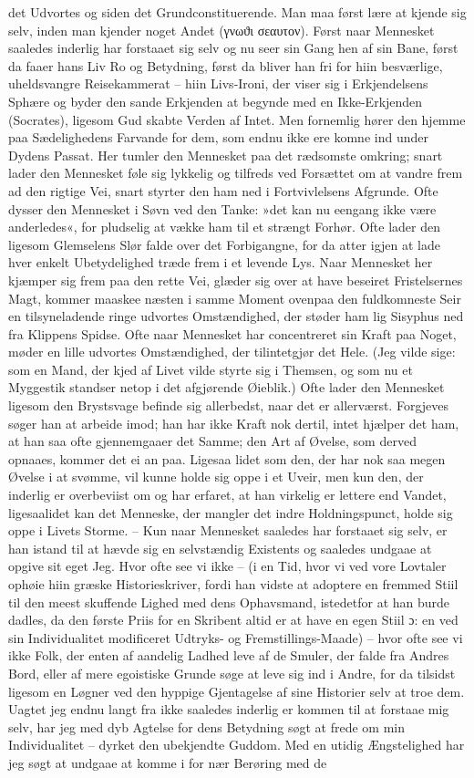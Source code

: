 \documentclass[12pt,a4paper]{article}
\begin{document}
det Udvortes og siden det Grundconstituerende. Man maa først lære at kjende sig selv, inden man kjender noget Andet (γνωϑι σεαυτον). Først naar Mennesket saaledes inderlig har forstaaet sig selv og nu seer sin Gang hen af sin Bane, først da faaer hans Liv Ro og Betydning, først da bliver han fri for hiin besværlige, uheldsvangre Reisekammerat – hiin Livs-Ironi, der viser sig i Erkjendelsens Sphære og byder den sande Erkjenden at begynde med en Ikke-Erkjenden (Socrates), ligesom Gud skabte Verden af Intet. Men fornemlig hører den hjemme paa Sædelighedens Farvande for dem, som endnu ikke ere komne ind under Dydens Passat. Her tumler den Mennesket paa det rædsomste omkring; snart lader den Mennesket føle sig lykkelig og tilfreds ved Forsættet om at vandre frem ad den rigtige Vei, snart styrter den ham ned i Fortvivlelsens Afgrunde. Ofte dysser den Mennesket i Søvn ved den Tanke: »det kan nu eengang ikke være anderledes«, for pludselig at vække ham til et strængt Forhør. Ofte lader den ligesom Glemselens Slør falde over det Forbigangne, for da atter igjen at lade hver enkelt Ubetydelighed træde frem i et levende Lys. Naar Mennesket her kjæmper sig frem paa den rette Vei, glæder sig over at have beseiret Fristelsernes Magt, kommer maaskee næsten i samme Moment ovenpaa den fuldkomneste Seir en tilsyneladende ringe udvortes Omstændighed, der støder ham lig Sisyphus ned fra Klippens Spidse. Ofte naar Mennesket har concentreret sin Kraft paa Noget, møder en lille udvortes Omstændighed, der tilintetgjør det Hele. (Jeg vilde sige: som en Mand, der kjed af Livet vilde styrte sig i Themsen, og som nu et Myggestik standser netop i det afgjørende Øieblik.) Ofte lader den Mennesket ligesom den Brystsvage befinde sig allerbedst, naar det er allerværst. Forgjeves søger han at arbeide imod; han har ikke Kraft nok dertil, intet hjælper det ham, at han saa ofte gjennemgaaer det Samme; den Art af Øvelse, som derved opnaaes, kommer det ei an paa. Ligesaa lidet som den, der har nok saa megen Øvelse i at svømme, vil kunne holde sig oppe i et Uveir, men kun den, der inderlig er overbeviist om og har erfaret, at han virkelig er lettere end Vandet, ligesaalidet kan det Menneske, der mangler det indre Holdningspunct, holde sig oppe i Livets Storme. – Kun naar Mennesket saaledes har forstaaet sig selv, er han istand til at hævde sig en selvstændig Existents og saaledes undgaae at opgive sit eget Jeg. Hvor ofte see vi ikke – (i en Tid, hvor vi ved vore Lovtaler ophøie hiin græske Historieskriver, fordi han vidste at adoptere en fremmed Stiil til den meest skuffende Lighed med dens Ophavsmand, istedetfor at han burde dadles, da den første Priis for en Skribent altid er at have en egen Stiil ɔ: en ved sin Individualitet modificeret Udtryks- og Fremstillings-Maade) – hvor ofte see vi ikke Folk, der enten af aandelig Ladhed leve af de Smuler, der falde fra Andres Bord, eller af mere egoistiske Grunde søge at leve sig ind i Andre, for da tilsidst ligesom en Løgner ved den hyppige Gjentagelse af sine Historier selv at troe dem. Uagtet jeg endnu langt fra ikke saaledes inderlig er kommen til at forstaae mig selv, har jeg med dyb Agtelse for dens Betydning søgt at frede om min Individualitet – dyrket den ubekjendte Guddom. Med en utidig Ængstelighed har jeg søgt at undgaae at komme i for nær Berøring med de 
\end{document}

